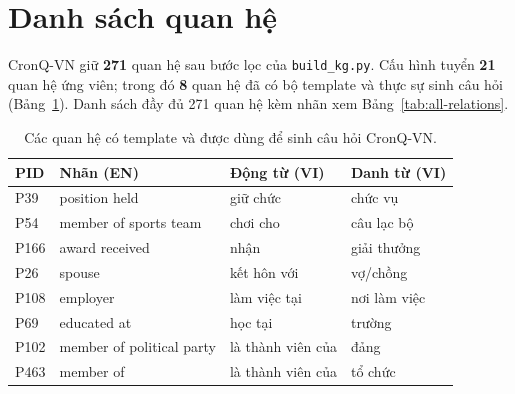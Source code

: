 \section{Danh sách quan hệ}
CronQ-VN giữ \textbf{271} quan hệ sau bước lọc của \texttt{build\_kg.py}. Cấu hình tuyển \textbf{21} quan hệ ứng viên; trong đó \textbf{8} quan hệ đã có bộ template và thực sự sinh câu hỏi (Bảng~\ref{tab:gen-relations}). Danh sách đầy đủ 271 quan hệ kèm nhãn xem Bảng~\ref{tab:all-relations}.

\begin{table}[htbp]
\centering
\caption{Các quan hệ có template và được dùng để sinh câu hỏi CronQ-VN.}
\label{tab:gen-relations}
\begin{tabular}{llll}
\toprule
PID & Nhãn (EN) & Động từ (VI) & Danh từ (VI) \\
\midrule
P39 & position held & giữ chức & chức vụ \\
P54 & member of sports team & chơi cho & câu lạc bộ \\
P166 & award received & nhận & giải thưởng \\
P26 & spouse & kết hôn với & vợ/chồng \\
P108 & employer & làm việc tại & nơi làm việc \\
P69 & educated at & học tại & trường \\
P102 & member of political party & là thành viên của & đảng \\
P463 & member of & là thành viên của & tổ chức \\
\bottomrule
\end{tabular}
\end{table}

